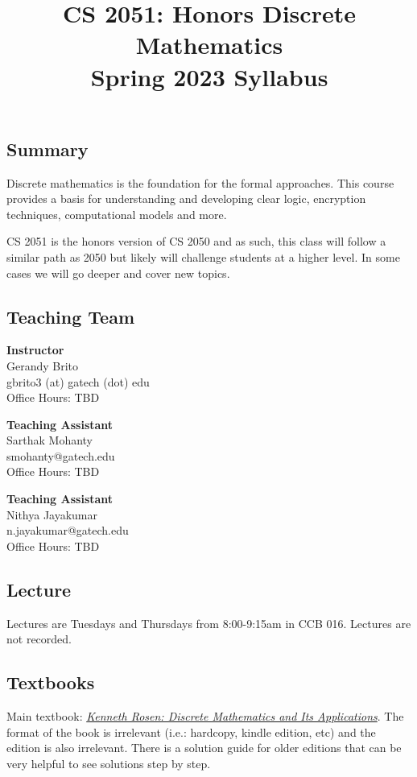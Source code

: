 \documentclass{article}
\title{\vspace{-1cm}CS 2051: Honors Discrete Mathematics \\Spring 2023 Syllabus\vspace{-1cm}}
\author{}
\date{}
\begin{document}
\maketitle

\subsection*{Summary}
    Discrete mathematics is the foundation for the formal approaches. This course provides a basis for understanding and developing clear logic, encryption techniques, computational models and more.
    
    \vspace{3mm}
    CS 2051 is the honors version of CS 2050 and as such, this class will follow a similar path as 2050 but likely will challenge students at a higher level. In some cases we will go deeper and cover new topics.

\subsection*{Teaching Team}
    \begin{multicols}{3}
        \textbf{Instructor} \\
        \noindent Gerandy Brito \\
        gbrito3 (at) gatech (dot) edu \\
        Office Hours: TBD
        
        \textbf{Teaching Assistant} \\
        Sarthak Mohanty \\
        smohanty@gatech.edu \\
        Office Hours: TBD
        
        \textbf{Teaching Assistant} \\
        Nithya Jayakumar \\
        n.jayakumar@gatech.edu \\
        Office Hours: TBD
    \end{multicols}


\subsection*{Lecture}
    Lectures are Tuesdays and Thursdays from 8:00-9:15am in CCB 016. Lectures are not recorded.
    
\subsection*{Textbooks}
    Main textbook: \textit{\href{https://www.amazon.com/Discrete-Mathematics-Applications-Kenneth-author-dp-1260091996/dp/1260091996/ref=dp_ob_title_bk}{Kenneth Rosen: Discrete Mathematics and Its Applications}}. The format of the book is irrelevant (i.e.: hardcopy, kindle edition, etc) and the edition is also irrelevant. There is a solution guide for older editions that can be very helpful to see solutions step by step.
    
\end{document}
